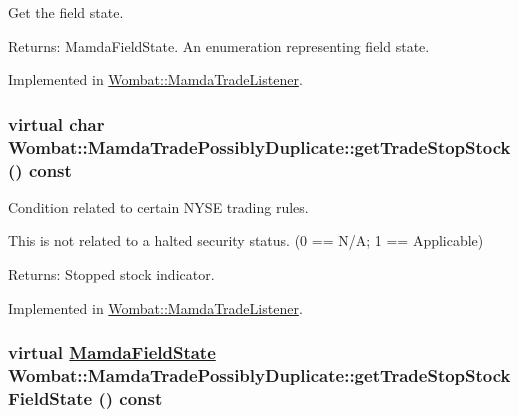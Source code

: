 Get the field state. 

\begin{Desc}
\item[Returns:]Mamda\-Field\-State. An enumeration representing field state. \end{Desc}


Implemented in \hyperlink{classWombat_1_1MamdaTradeListener_2090b9605a4191bf78b5cef58c7e1fbe}{Wombat::Mamda\-Trade\-Listener}.\hypertarget{classWombat_1_1MamdaTradePossiblyDuplicate_ee52eadfef02fa09483632232a943503}{
\subsubsection[getTradeStopStock]{\setlength{\rightskip}{0pt plus 5cm}virtual char Wombat::Mamda\-Trade\-Possibly\-Duplicate::get\-Trade\-Stop\-Stock () const}}
\label{classWombat_1_1MamdaTradePossiblyDuplicate_ee52eadfef02fa09483632232a943503}


Condition related to certain NYSE trading rules. 

This is not related to a halted security status. (0 == N/A; 1 == Applicable)

\begin{Desc}
\item[Returns:]Stopped stock indicator. \end{Desc}


Implemented in \hyperlink{classWombat_1_1MamdaTradeListener_2d4333ba424d00cbda5e88a846ef3c8c}{Wombat::Mamda\-Trade\-Listener}.\hypertarget{classWombat_1_1MamdaTradePossiblyDuplicate_5ab03194fc902b4dabda0ad0291cc7ff}{
\subsubsection[getTradeStopStockFieldState]{\setlength{\rightskip}{0pt plus 5cm}virtual \hyperlink{namespaceWombat_93aac974f2ab713554fd12a1fa3b7d2a}{Mamda\-Field\-State} Wombat::Mamda\-Trade\-Possibly\-Duplicate::get\-Trade\-Stop\-Stock\-Field\-State () const}}
\label{classWombat_1_1MamdaTradePossiblyDuplicate_5ab03194fc902b4dabda0ad0291cc7ff}


